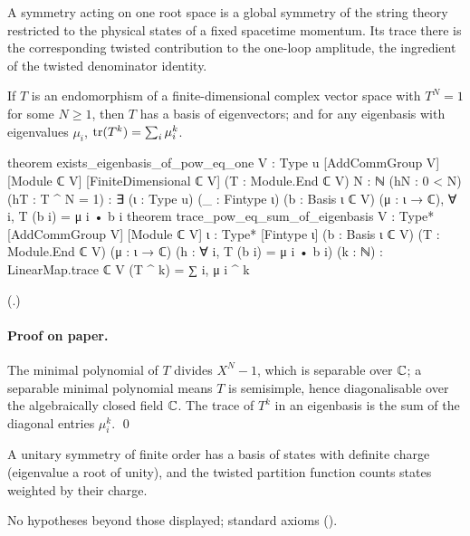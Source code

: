 \begin{physics}
A symmetry acting on one root space is a global symmetry of the string theory restricted to the physical states of a
fixed spacetime momentum. Its trace there is the corresponding twisted contribution to the one-loop amplitude, the
ingredient of the twisted denominator identity.
\end{physics}

\begin{theorem}\label{ch19:thm:eigen}
If $T$ is an endomorphism of a finite-dimensional complex vector space with $T^N=1$ for some $N\ge1$, then $T$ has a basis of
eigenvectors; and for any eigenbasis with eigenvalues $\mu_i$, $\operatorname{tr}(T^k)=\sum_i\mu_i^k$.
\end{theorem}
\begin{leancode}
theorem exists_eigenbasis_of_pow_eq_one {V : Type u} [AddCommGroup V] [Module ℂ V]
    [FiniteDimensional ℂ V] (T : Module.End ℂ V) {N : ℕ} (hN : 0 < N) (hT : T ^ N = 1) :
    ∃ (ι : Type u) (_ : Fintype ι) (b : Basis ι ℂ V) (μ : ι → ℂ), ∀ i, T (b i) = μ i • b i
theorem trace_pow_eq_sum_of_eigenbasis {V : Type*} [AddCommGroup V] [Module ℂ V]
    {ι : Type*} [Fintype ι] (b : Basis ι ℂ V) (T : Module.End ℂ V) (μ : ι → ℂ)
    (h : ∀ i, T (b i) = μ i • b i) (k : ℕ) :
    LinearMap.trace ℂ V (T ^ k) = ∑ i, μ i ^ k
\end{leancode}
(.)
\paragraph{Proof on paper.}  The minimal polynomial of $T$ divides $X^N-1$, which is separable over ${\mathbb{C}}$; a separable
minimal polynomial means $T$ is semisimple, hence diagonalisable over the algebraically closed field ${\mathbb{C}}$.  The trace of
$T^k$ in an eigenbasis is the sum of the diagonal entries $\mu_i^k$. \qed
\begin{physics}A unitary symmetry of finite order has a basis of states with definite charge (eigenvalue a root of unity),
and the twisted partition function counts states weighted by their charge.\end{physics}
\begin{status}No hypotheses beyond those displayed; standard axioms ().\end{status}

